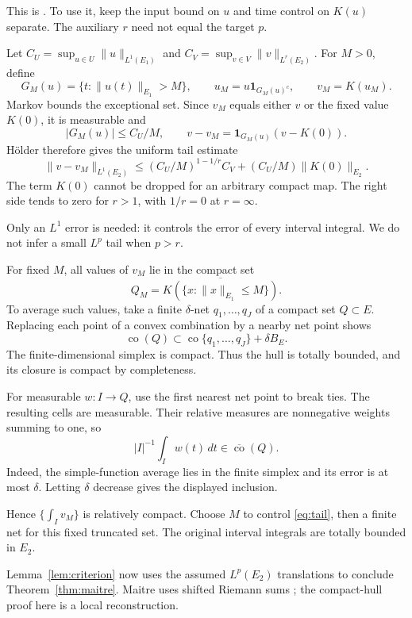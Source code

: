 \documentclass[12pt,reqno]{amsart}
\begin{document}
This is \cite[Theorem 2.1, p.~1726]{S-maitre}. To use it, keep the input bound on $u$ and time control on $K(u)$ separate. The auxiliary $r$ need not equal the target $p$.

Let $C_U=\sup_{u\in U}\|u\|_{L^1(E_1)}$ and $C_V=\sup_{v\in V}\|v\|_{L^r(E_2)}$. For $M>0$, define
\[
G_M(u)=\{t:\|u(t)\|_{E_1}>M\},\qquad
u_M=u\mathbf1_{G_M(u)^c},\qquad v_M=K(u_M).
\]
Markov bounds the exceptional set. Since $v_M$ equals either $v$ or the fixed value $K(0)$, it is measurable and
\[
|G_M(u)|\le C_U/M,\qquad v-v_M=\mathbf1_{G_M(u)}(v-K(0)).
\]
H\"older therefore gives the uniform tail estimate
\begin{equation}\label{eq:tail}
\|v-v_M\|_{L^1(E_2)}
\le (C_U/M)^{1-1/r}C_V+(C_U/M)\|K(0)\|_{E_2}.
\end{equation}
The term $K(0)$ cannot be dropped for an arbitrary compact map. The right side tends to zero for $r>1$, with $1/r=0$ at $r=\infty$.

Only an $L^1$ error is needed: it controls the error of every interval integral. We do not infer a small $L^p$ tail when $p>r$.

For fixed $M$, all values of $v_M$ lie in the compact set
\[
Q_M=\overline{K(\{x:\|x\|_{E_1}\le M\})}.
\]
To average such values, take a finite $\delta$-net $q_1,\ldots,q_J$ of a compact set $Q\subset E$. Replacing each point of a convex combination by a nearby net point shows
\[
\operatorname{co}(Q)\subset
\operatorname{co}\{q_1,\ldots,q_J\}+\delta B_E.
\]
The finite-dimensional simplex is compact. Thus the hull is totally bounded, and its closure is compact by completeness.

For measurable $w:I\to Q$, use the first nearest net point to break ties. The resulting cells are measurable. Their relative measures are nonnegative weights summing to one, so
\[
|I|^{-1}\int_Iw(t)\,dt\in\overline{\operatorname{co}}(Q).
\]
Indeed, the simple-function average lies in the finite simplex and its error is at most $\delta$. Letting $\delta$ decrease gives the displayed inclusion.

Hence $\{\int_Iv_M\}$ is relatively compact. Choose $M$ to control \eqref{eq:tail}, then a finite net for this fixed truncated set. The original interval integrals are totally bounded in $E_2$.

Lemma~\ref{lem:criterion} now uses the assumed $L^p(E_2)$ translations to conclude Theorem~\ref{thm:maitre}. Maitre uses shifted Riemann sums \cite[Lemma 2.3, pp.~1726--1730]{S-maitre}; the compact-hull proof here is a local reconstruction.
\end{document}
